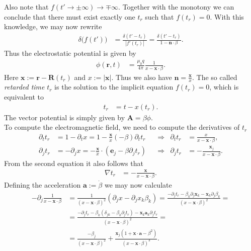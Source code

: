 \documentclass[english, parskip=full]{scrartcl}
\newcommand{\kla}{}
\begin{document}
Also note that $f(t'\rightarrow \pm \infty) \rightarrow \mp \infty$.
Together with the monotony we can conclude that there must exist exactly one $t_r$ such that $f(t_r) = 0$.
With this knowledge, we may now rewrite
\begin{align}
\delta\big(f(t')\big) &= \frac{\delta (t' - t_r)}{|f'(t_r)|} = \frac{\delta (t' - t_r)}{1 - \textbf{n} \cdot \beta}.
\end{align}
Thus the electrostatic potential is given by
\begin{align}
\phi(\textbf{r},t) &= \frac{\mu_0 q}{4\pi} \frac{1}{x - \textbf{x} \cdot \beta}.
\end{align}
Here $\textbf{x} := \textbf{r} - \textbf{R}(t_r)$ and $x := |\textbf{x}|$.
Thus we also have $\textbf{n} = \frac{\textbf{x}}{x}$.
The so called \emph{retarded time} $t_r$ is the solution to the implicit equation $f(t_r) = 0$, which is equivalent to
\begin{align}
t_r &= t - x(t_r).
\end{align}
The vector potential is simply given by $\textbf{A} = \beta \phi$.
\\
To compute the electromagnetic field, we need to compute the derivatives of $t_r$
\begin{align}
\partial_t t_r &= 1 - \partial_t x = 1 - \frac{\textbf{x}}{x} \kla\left( -\beta \right) \partial_t t_r &&\Rightarrow & \partial_tt_r &= \frac{x}{x - \textbf{x}\cdot\beta},\\
\partial_j t_r &= -\partial_j x = -\frac{\textbf{x}}{x} \cdot \kla\left( \textbf{e}_j - \beta \partial_jt_r \right) &&\Rightarrow & \partial_j t_r &= -\frac{\textbf{x}_j}{x - \textbf{x}\cdot \beta}.
\end{align}
From the second equation it also follows that 
\begin{align}
\nabla t_r &= -\frac{\textbf{x}}{x - \textbf{x} \cdot \beta}.
\end{align}
Defining the acceleration $\textbf{a} := \dot{\beta}$ we may now calculate
\begin{align}
-\partial_j \frac{1}{x - \textbf{x}\cdot\beta} &= \frac{1}{\kla\left( x - \textbf{x}\cdot\beta \right)^2} \kla\left( \partial_j x - \partial_j x_k\beta_k  \right) = \frac{-\partial_jt_r - \beta_k \partial_j \textbf{x}_k - \textbf{x}_k \partial_j\beta_k}{(x - \textbf{x}\cdot\beta)^2} = \\
&= \frac{-\partial_j t_r - \beta_k (\delta_{jk} - \beta_k \partial_j t_r) - \textbf{x}_k \textbf{a}_k \partial_j t_r }{(x - \textbf{x}\cdot\beta)^2} = \\
&= \frac{-\beta_j}{(x - \textbf{x}\cdot\beta)^2} + \frac{\textbf{x}_j \kla\left( 1 + \textbf{x}\cdot\textbf{a} - \beta^2 \right)}{(x - \textbf{x}\cdot\beta)^3}. \label{eqn:LW partial j 1 over x}
\end{align}
\end{document}
